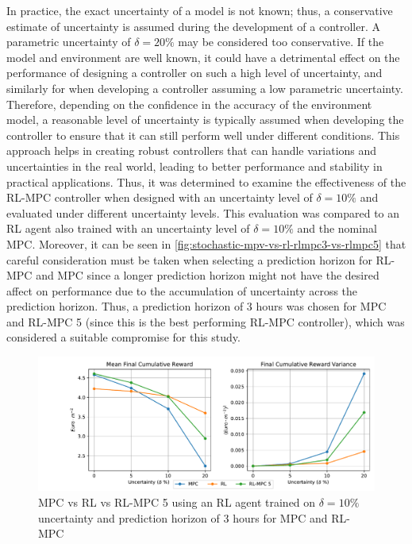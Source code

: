In practice, the exact uncertainty of a model is not known; thus, a conservative estimate of uncertainty is assumed during the development of a controller. A parametric uncertainty of $\delta = 20\%$ may be considered too conservative. If the model and environment are well known, it could have a detrimental effect on the performance of designing a controller on such a high level of uncertainty, and similarly for when developing a controller assuming a low parametric uncertainty. Therefore, depending on the confidence in the accuracy of the environment model, a reasonable level of uncertainty is typically assumed when developing the controller to ensure that it can still perform well under different conditions. This approach helps in creating robust controllers that can handle variations and uncertainties in the real world, leading to better performance and stability in practical applications. Thus, it was determined to examine the effectiveness of the RL-MPC controller when designed with an uncertainty level of $\delta = 10\%$ and evaluated under different uncertainty levels. This evaluation was compared to an RL agent also trained with an uncertainty level of $\delta = 10\%$ and the nominal MPC. Moreover, it can be seen in \autoref{fig:stochastic-mpv-vs-rl-rlmpc3-vs-rlmpc5} that careful consideration must be taken when selecting a prediction horizon for RL-MPC and MPC since a longer prediction horizon might not have the desired affect on performance due to the accumulation of uncertainty across the prediction horizon. Thus, a prediction horizon of 3 hours was chosen for MPC and RL-MPC 5 (since this is the best performing RL-MPC controller), which was considered a suitable compromise for this study.

\begin{figure}[H]
	\centering
	\includegraphics[width=\textwidth]{figures/stochastic_realife.pdf}
	\caption{MPC vs RL vs RL-MPC 5 using an RL agent trained on $\delta = 10\%$ uncertainty and prediction horizon of 3 hours for MPC and RL-MPC}
	\label{fig:stochastic-reallife}
\end{figure}

